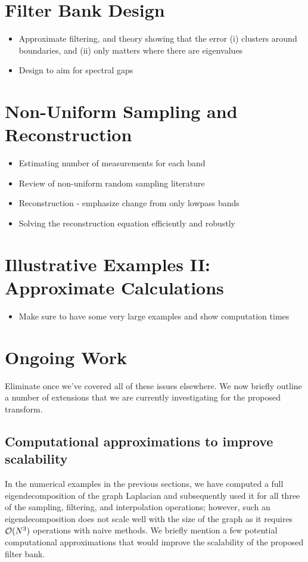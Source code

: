 \documentclass[journal, 10pt]{IEEEtran}
\begin{document}
{\color{blue}
\section{Filter Bank Design}
\begin{itemize}
\item Approximate filtering, and theory showing that the error (i) clusters around boundaries, and (ii) only matters where there are eigenvalues
\item Design to aim for spectral gaps
\end{itemize}

\section{Non-Uniform Sampling and Reconstruction}
\begin{itemize}
\item Estimating number of measurements for each band
\item Review of non-uniform random sampling literature
\item Reconstruction - emphasize change from only lowpass bands
\item {\color{red} Solving the reconstruction equation efficiently and robustly}
\end{itemize}

\section{Illustrative Examples II: Approximate Calculations}
\begin{itemize}
\item Make sure to have some very large examples and show computation times
\end{itemize}
}


\section{Ongoing Work}
\label{Sec:ongoing}
{\color{red} Eliminate once we've covered all of these issues elsewhere.}
We now briefly outline a number of extensions that we are currently investigating for the proposed transform.

\subsection{Computational approximations to improve scalability}
In the numerical examples in the previous sections, we have computed a full eigendecomposition of the graph Laplacian and subsequently used it for all three of the sampling, filtering, and interpolation operations; however, such an eigendecomposition does not scale well with the size of the graph as it requires ${\cal O}(N^3)$ operations with naive methods. We briefly mention a few potential computational approximations that would improve the scalability of the proposed filter bank.
\end{document}
